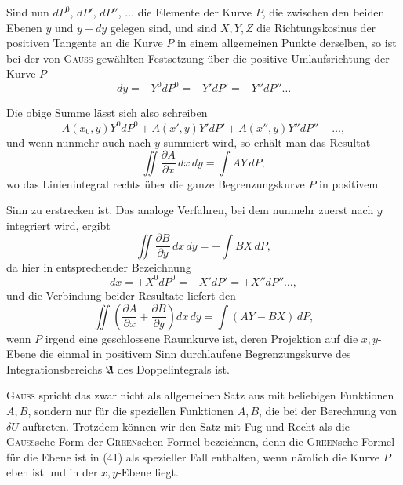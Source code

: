 Sind nun $dP^0$, $dP'$, $dP''$, $\ldots$ die Elemente der Kurve $P$, die zwischen den
beiden Ebenen $y$ und $y+dy$ gelegen sind, und sind $X,Y,Z$ die Richtungskosinus
der positiven Tangente an die Kurve $P$ in einem allgemeinen Punkte
derselben, so ist bei der von \textsc{Gauss} gewählten Festsetzung über die positive
Umlaufsrichtung der Kurve $P$
\begin{equation*}
dy=-Y^0dP^0=+Y'dP'=-Y''dP''\ldots\tag{39}
\end{equation*}

Die obige Summe lässt sich also schreiben
\[
A(x_0,y)Y^0dP^0+A(x',y)Y'dP'+A(x'',y)Y''dP''+\ldots,
\]
und wenn nunmehr auch nach $y$ summiert wird, so erhält man das Resultat
\[
\iint\frac{\partial A}{\partial x}\,dx\,dy=\int AY\,dP,
\]
wo das Linienintegral rechts über die ganze Begrenzungskurve $P$ in positivem
\par\clearpage{}
\noindent Sinn zu erstrecken ist. Das analoge Verfahren, bei dem nunmehr zuerst nach
$y$ integriert wird, ergibt
\[
\iint\frac{\partial B}{\partial y}\,dx\,dy=-\int BX\,dP,
\]
da hier in entsprechender Bezeichnung
\begin{equation*}
dx=+X^0dP^0=-X'dP'=+X''dP''\ldots,\tag{40}
\end{equation*}
und die Verbindung beider Resultate liefert den 
\begin{equation*}
\iint\left(\frac{\partial A}{\partial x}+\frac{\partial B}{\partial y}\right)dx\,dy=\int(AY-BX)\,dP,\tag{41}
\end{equation*}
wenn $P$ irgend eine geschlossene Raumkurve ist, deren Projektion auf die
$x,y$-Ebene die einmal in positivem Sinn durchlaufene Begrenzungskurve des
Integrationsbereichs $\mathfrak{A}$ des Doppelintegrals ist.

\textsc{Gauss} spricht das zwar nicht als allgemeinen Satz aus mit beliebigen
Funktionen $A,B$, sondern nur für die speziellen Funktionen $A,B$, die bei
der Berechnung von $\delta U$ auftreten. Trotzdem können wir den Satz mit Fug
und Recht als die \textsc{Gauss}sche Form der \textsc{Green}schen Formel bezeichnen,
denn die \textsc{Green}sche Formel für die Ebene ist in (41) als spezieller Fall enthalten,
wenn nämlich die Kurve $P$ eben ist und in der $x,y$-Ebene liegt.
\par\clearpage\endgroup
